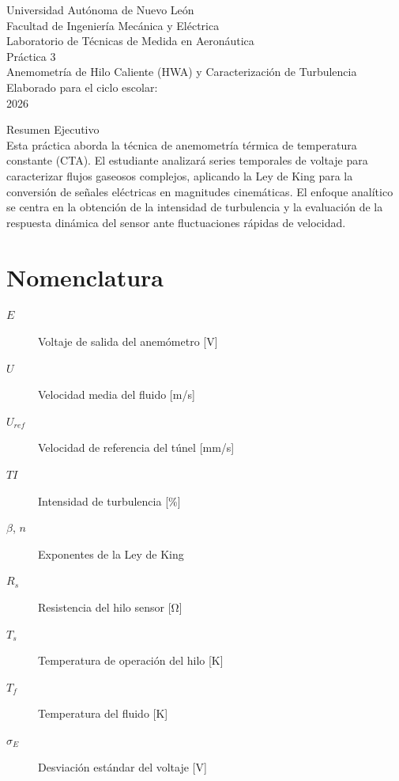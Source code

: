 \documentclass[11pt, a4paper]{article}
\begin{document}
\begin{titlepage}
    \centering
    {\LARGE Universidad Autónoma de Nuevo León}\\[0.5cm]
    {\Large Facultad de Ingeniería Mecánica y Eléctrica}\\[2cm]
    
    {\Large Laboratorio de Técnicas de Medida en Aeronáutica}\\[1cm]
    
    {\Huge Práctica 3}\\[0.5cm]
    {\Large Anemometría de Hilo Caliente (HWA) y Caracterización de Turbulencia}\\[2cm]
    
    Elaborado para el ciclo escolar:\\
    2026\\[2cm]
    
    \vfill
    
    Resumen Ejecutivo\\
    Esta práctica aborda la técnica de anemometría térmica de temperatura constante (CTA). El estudiante analizará series temporales de voltaje para caracterizar flujos gaseosos complejos, aplicando la Ley de King para la conversión de señales eléctricas en magnitudes cinemáticas. El enfoque analítico se centra en la obtención de la intensidad de turbulencia y la evaluación de la respuesta dinámica del sensor ante fluctuaciones rápidas de velocidad.
\end{titlepage}

\tableofcontents
\newpage

\section*{Nomenclatura}
\begin{description}
    \item[$E$] Voltaje de salida del anemómetro [V]
    \item[$U$] Velocidad media del fluido [m/s]
    \item[$U_{ref}$] Velocidad de referencia del túnel [mm/s]
    \item[$TI$] Intensidad de turbulencia [\%]
    \item[$\beta$, $n$] Exponentes de la Ley de King
    \item[$R_s$] Resistencia del hilo sensor [\si{\ohm}]
    \item[$T_s$] Temperatura de operación del hilo [K]
    \item[$T_f$] Temperatura del fluido [K]
    \item[$\sigma_E$] Desviación estándar del voltaje [V]
\end{description}
\end{document}
